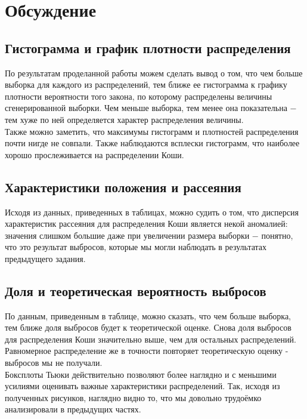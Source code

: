 \section{Обсуждение}
\subsection{Гистограмма и график плотности распределения}
\begin{flushleft}
	По результатам проделанной работы можем сделать вывод о том, что чем больше выборка для каждого из распределений, тем ближе ее гистограмма к графику плотности вероятности того закона, по которому распределены величины сгенерированной выборки. Чем меньше выборка, тем менее она показательна $-$ тем хуже по ней определяется характер распределения величины. \\
	Также можно заметить, что максимумы гистограмм и плотностей распределения почти нигде не совпали. Также наблюдаются всплески гистограмм, что наиболее хорошо прослеживается на распределении Коши.
\end{flushleft}

\subsection{Характеристики положения и рассеяния}
\begin{flushleft}
	Исходя из данных, приведенных в таблицах, можно судить о том, что дисперсия характеристик рассеяния для распределения Коши является некой аномалией: значения слишком большие даже при увеличении размера выборки $-$ понятно, что это результат выбросов, которые мы могли наблюдать в результатах предыдущего задания.
\end{flushleft}

\subsection{Доля и теоретическая вероятность выбросов}
\begin{flushleft}
	По данным, приведенным в таблице, можно сказать, что чем больше выборка, тем ближе доля выбросов будет к теоретической оценке. Снова доля выбросов для распределения Коши значительно выше, чем для остальных распределений. Равномерное распределение же в точности повторяет теоретическую оценку - выбросов мы не получали. \\
	Боксплоты Тьюки действительно позволяют более наглядно и с меньшими	усилиями оценивать важные характеристики распределений. Так, исходя	из полученных рисунков, наглядно видно то, что мы довольно трудоёмко анализировали в предыдущих частях.
\end{flushleft}


